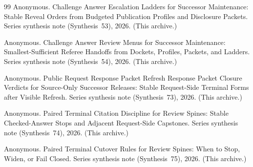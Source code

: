 \documentclass[11pt]{article}
\begin{document}
\begin{thebibliography}{99}
Anonymous.
\newblock Challenge Answer Escalation Ladders for Successor Maintenance: Stable Reveal Orders from Budgeted Publication Profiles and Disclosure Packets.
\newblock Series synthesis note (Synthesis~53), 2026. (This archive.)

Anonymous.
\newblock Challenge Answer Review Menus for Successor Maintenance: Smallest-Sufficient Referee Handoffs from Dockets, Profiles, Packets, and Ladders.
\newblock Series synthesis note (Synthesis~54), 2026. (This archive.)

Anonymous.
\newblock Public Request Response Packet Refresh Response Packet Closure Verdicts for Source-Only Successor Releases: Stable Request-Side Terminal Forms after Visible Refresh.
\newblock Series synthesis note (Synthesis~73), 2026. (This archive.)

Anonymous.
\newblock Paired Terminal Citation Discipline for Review Spines: Stable Checked-Answer Stops and Adjacent Request-Side Capstones.
\newblock Series synthesis note (Synthesis~74), 2026. (This archive.)

Anonymous.
\newblock Paired Terminal Cutover Rules for Review Spines: When to Stop, Widen, or Fail Closed.
\newblock Series synthesis note (Synthesis~75), 2026. (This archive.)

\end{thebibliography}
\end{document}
